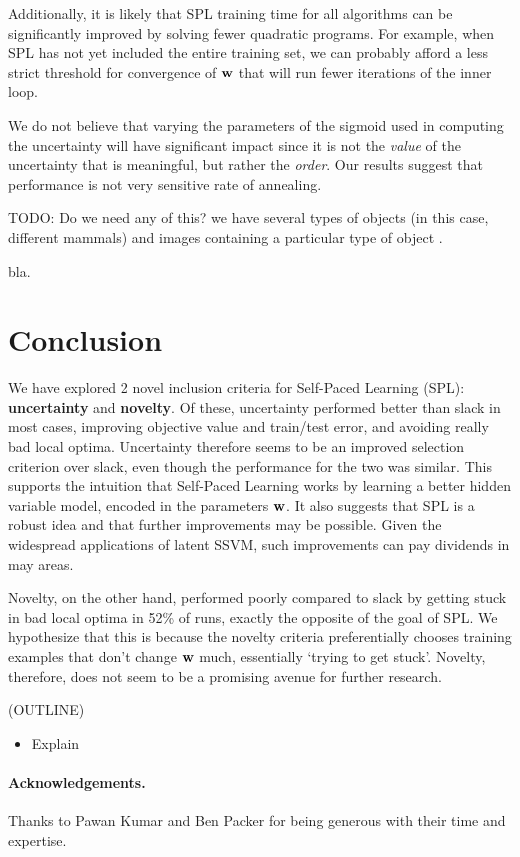 \documentclass{article}
\newcommand{\mysection}[1]{\vspace{-4mm}\section{#1}\vspace{-4mm}}
\newcommand{\myparagraph}[1]{\vspace{-2mm}\paragraph{#1}}
\begin{document}
Additionally, it is likely that SPL training time for all algorithms can be significantly improved by solving fewer quadratic programs.  For example, when SPL has not yet included the entire training set, we can probably afford a less strict threshold for convergence of $\bf w$ that will run fewer iterations of the inner loop.

We do not believe that varying the parameters of the sigmoid used in computing the uncertainty will have significant impact since it is not the \emph{value} of the uncertainty that is meaningful, but rather the \emph{order}.  Our results suggest that performance is not very sensitive rate of annealing.


TODO: Do we need any of this?
we have several types of objects (in this case, different mammals) and 
 images containing a particular type of object .

bla.
\mysection{Conclusion}
\label{sec:conclusion}

We have explored 2 novel inclusion criteria for Self-Paced Learning ({\sc SPL}): \textbf{uncertainty} and \textbf{novelty}.  Of these, uncertainty performed better than slack in most cases, improving objective value and train/test error, and avoiding really bad local optima.  Uncertainty therefore seems to be an improved selection criterion over slack, even though the performance for the two was similar.  This supports the intuition that Self-Paced Learning works by learning a better hidden variable model, encoded in the parameters $\bf w$.  It also suggests that SPL is a robust idea and that further improvements may be possible.  Given the widespread applications of latent SSVM, such improvements can pay dividends in may areas.

Novelty, on the other hand, performed poorly compared to slack by getting stuck in bad local optima in 52\% of runs, exactly the opposite of the goal of SPL.  We hypothesize that this is because the novelty criteria preferentially chooses training examples that don't change $\bf w$ much, essentially `trying to get stuck'.  Novelty, therefore, does not seem to be a promising avenue for further research.

(OUTLINE)
\begin{itemize}
\item Explain 
\end{itemize}

\myparagraph{Acknowledgements.}
Thanks to Pawan Kumar and Ben Packer for being generous with their time and expertise.
\end{document}
